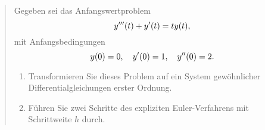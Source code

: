 \documentclass{exercise}
\begin{document}
	\section{}

	\begin{quote}
		Gegeben sei das Anfangswertproblem
		\[
			y'''\parentheses*{t} + y'\parentheses*{t} = ty\parentheses*{t},
		\]
		mit Anfangsbedingungen
		\[
			y\parentheses*{0} = 0,\quad y'\parentheses*{0} = 1, \quad y''\parentheses*{0} = 2.
		\]
		\begin{enumerate}
			\item Transformieren Sie dieses Problem auf ein System gewöhnlicher Differentialgleichungen erster Ordnung.
			\item Führen Sie zwei Schritte des expliziten Euler-Verfahrens mit Schrittweite \(h\) durch.
		\end{enumerate}
	\end{quote}
\end{document}
